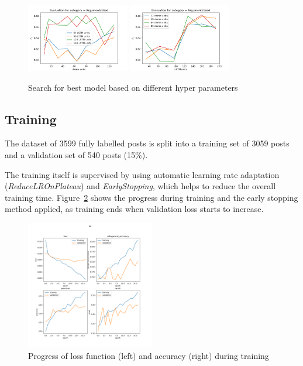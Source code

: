 \documentclass[11pt,a4paper]{article}
\begin{document}
\begin{figure}[h!]
	\centering
	\includegraphics[trim={0.1cm 0cm 0.7cm 0.7cm},clip,width=0.4\textwidth]{img/training_meta}
	\includegraphics[trim={0.1cm 0cm 0.7cm 1.2cm},clip,width=0.4\textwidth]{img/training_meta2}
	\caption{Search for best model based on different hyper parameters}
	\label{fig:hyper_params}
\end{figure}


\subsection{Training}

The dataset of 3599 fully labelled posts is split into a training set of 3059 posts and a validation set of 540 posts (15\%).

The training itself is supervised by using automatic learning rate adaptation (\textit{ReduceLROnPlateau}) and \textit{EarlyStopping}, which helps to reduce the overall training time.
Figure~\ref{fig:training_loss} shows the progress during training and the early stopping method applied, as training ends when validation loss starts to increase.

\begin{figure}[h!]
	\centering
	\includegraphics[trim={1.4cm 12.4cm 2cm 2.5cm},clip,width=0.5\textwidth]{img/training_All_17}
	\caption{Progress of loss function (left) and accuracy (right) during training}
	\label{fig:training_loss}
\end{figure}
\end{document}
